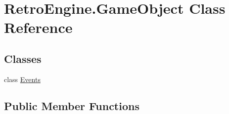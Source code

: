 \hypertarget{class_retro_engine_1_1_game_object}{}\section{Retro\+Engine.\+Game\+Object Class Reference}
\label{class_retro_engine_1_1_game_object}
\subsection*{Classes}
\begin{DoxyCompactItemize}
\item 
class \mbox{\hyperlink{class_retro_engine_1_1_game_object_1_1_events}{Events}}
\end{DoxyCompactItemize}
\subsection*{Public Member Functions}
